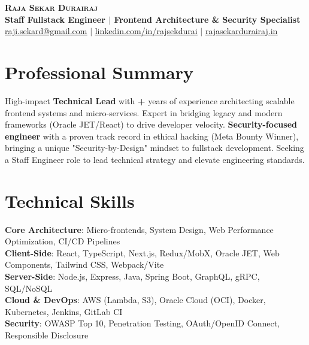 \documentclass[letterpaper,11pt]{article}
\newcounter{TotalYears}
\begin{document}
\begin{center}
    \textbf{\Huge \scshape Raja Sekar Durairaj} \\ \vspace{5pt}
    \textbf{\large Staff Fullstack Engineer $|$ Frontend Architecture \& Security Specialist} \\ \vspace{5pt}
    \small \href{mailto:raji.sekard@gmail.com}{\underline{raji.sekard@gmail.com}} $|$ 
    \href{https://www.linkedin.com/in/rajsekdurai}{\underline{linkedin.com/in/rajsekdurai}} $|$
    \href{https://www.rajasekardurairaj.in/}{\underline{rajasekardurairaj.in}}
\end{center}

\section{Professional Summary}
\small{
High-impact \textbf{Technical Lead} with \textbf{\the\value{TotalYears}+} years of experience architecting scalable frontend systems and micro-services. Expert in bridging legacy and modern frameworks (Oracle JET/React) to drive developer velocity. \textbf{Security-focused engineer} with a proven track record in ethical hacking (Meta Bounty Winner), bringing a unique "Security-by-Design" mindset to fullstack development. Seeking a Staff Engineer role to lead technical strategy and elevate engineering standards.
}
\vspace{8pt}

\section{Technical Skills}
 \begin{itemize}[leftmargin=0.15in, label={}]
    \small{\item{
     \textbf{Core Architecture}{: Micro-frontends, System Design, Web Performance Optimization, CI/CD Pipelines} \\
     \textbf{Client-Side}{: React, TypeScript, Next.js, Redux/MobX, Oracle JET, Web Components, Tailwind CSS, Webpack/Vite} \\
     \textbf{Server-Side}{: Node.js, Express, Java, Spring Boot, GraphQL, gRPC, SQL/NoSQL} \\
     \textbf{Cloud \& DevOps}{: AWS (Lambda, S3), Oracle Cloud (OCI), Docker, Kubernetes, Jenkins, GitLab CI} \\
     \textbf{Security}{: OWASP Top 10, Penetration Testing, OAuth/OpenID Connect, Responsible Disclosure}
    }}
 \end{itemize}
\end{document}
